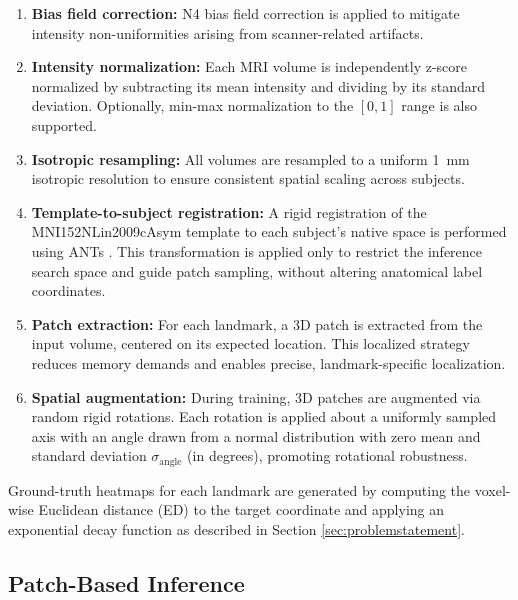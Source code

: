 \begin{enumerate}
    \item \textbf{Bias field correction:} N4 bias field correction \cite{Tustison2010-nw} is applied to mitigate intensity non-uniformities arising from scanner-related artifacts.
    
    \item \textbf{Intensity normalization:} Each MRI volume is independently z-score normalized by subtracting its mean intensity and dividing by its standard deviation. Optionally, min-max normalization to the \([0, 1]\) range is also supported.

    
    \item \textbf{Isotropic resampling:} All volumes are resampled to a uniform 1~mm isotropic resolution to ensure consistent spatial scaling across subjects.
    
    \item \textbf{Template-to-subject registration:} A rigid registration of the MNI152NLin2009cAsym template to each subject’s native space is performed using ANTs \cite{Avants2011-zs}. This transformation is applied only to restrict the inference search space and guide patch sampling, without altering anatomical label coordinates.
    
    \item \textbf{Patch extraction:} For each landmark, a 3D patch is extracted from the input volume, centered on its expected location. This localized strategy reduces memory demands and enables precise, landmark-specific localization.
    
    \item \textbf{Spatial augmentation:} During training, 3D patches are augmented via random rigid rotations. Each rotation is applied about a uniformly sampled axis with an angle drawn from a normal distribution with zero mean and standard deviation $\sigma_{\text{angle}}$ (in degrees), promoting rotational robustness.
\end{enumerate}

Ground-truth heatmaps for each landmark are generated by computing the voxel-wise Euclidean distance (ED) to the target coordinate and applying an exponential decay function as described in Section \ref{sec:problemstatement}.

\subsection{Patch-Based Inference}

